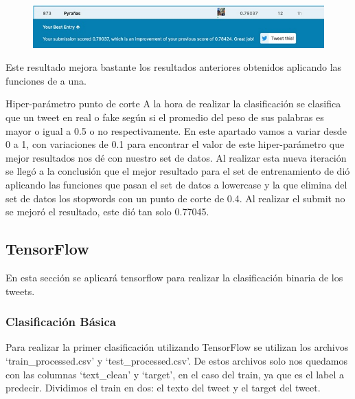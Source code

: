 \documentclass[12pt]{article}
\begin{document}
\begin{figure}[H]
    \centering
    \includegraphics[scale = 0.9]{imgs/tweet_1.jpg}
    \label{tp:fig:equilibrium}
\end{figure}


Este resultado mejora bastante los resultados anteriores obtenidos aplicando las funciones de a una.

Hiper-parámetro punto de corte
A la hora de realizar la clasificación se clasifica que un tweet en real o fake según si el promedio del peso de sus palabras es mayor o igual a 0.5 o no respectivamente.
En este apartado vamos a variar desde 0 a 1, con variaciones de 0.1 para encontrar el valor de este hiper-parámetro que mejor resultados nos dé con nuestro set de datos.
Al realizar esta nueva iteración se llegó a la conclusión que el mejor resultado para el set de entrenamiento de dió aplicando las funciones que pasan el set de datos a lowercase y la que elimina del set de datos los stopwords con un punto de corte de 0.4. Al realizar el submit no se mejoró el resultado, este dió tan solo 0.77045.


\newpage
\subsection{TensorFlow}
En esta sección se aplicará tensorflow para realizar la clasificación binaria de los tweets.


\subsubsection{Clasificación Básica}
Para realizar la primer clasificación utilizando TensorFlow se utilizan los archivos ‘train\_processed.csv’ y ‘test\_processed.csv’.
De estos archivos solo nos quedamos con las columnas ‘text\_clean’ y ‘target’, en el caso del train, ya que es el label a predecir.
Dividimos el train en dos: el texto del tweet y el target del tweet.
\end{document}
